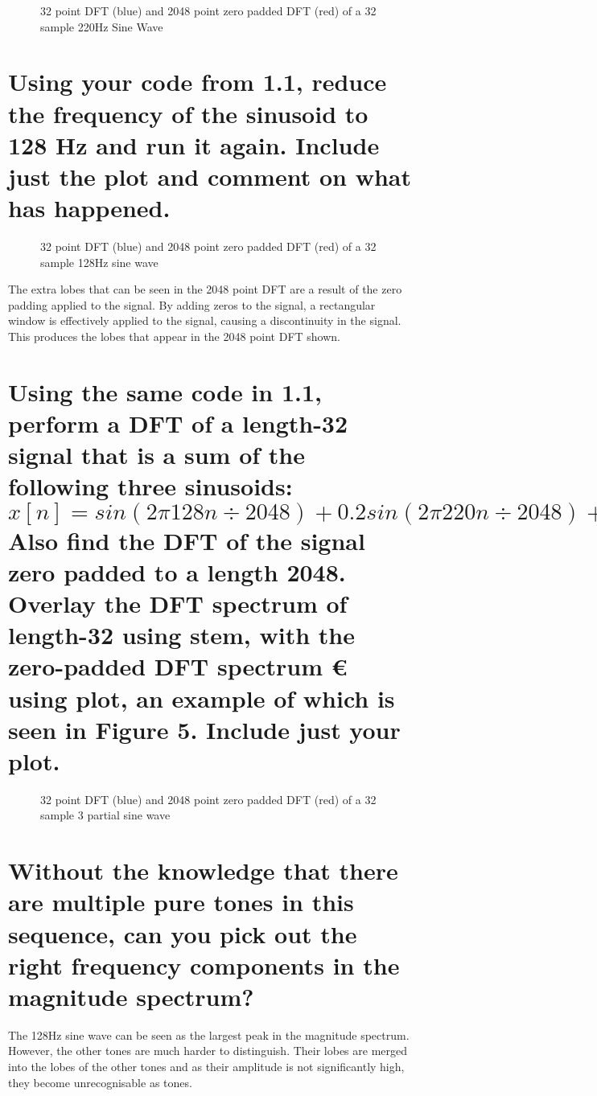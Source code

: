 \documentclass[titlepage]{scrartcl}
\begin{document}
\begin{figure}[H]
    \caption{32 point DFT (blue) and 2048 point zero padded DFT (red) of a
    32 sample 220Hz Sine Wave}
    \label{ZeropadDFT1}
\end{figure}

\section{Using your code from 1.1, reduce the frequency of the sinusoid to 128
Hz and run it again. Include just the plot and comment on what has happened.}
\begin{figure}[H]
    \caption{32 point DFT (blue) and 2048 point zero padded DFT (red) of a 32
    sample 128Hz sine wave}
    \label{ZeropadDFT2}
\end{figure}

The extra lobes that can be seen in the 2048 point DFT are a result of the
zero padding applied to the signal. By adding zeros to the signal, a rectangular
window is effectively applied to the signal, causing a discontinuity in the
signal. This produces the lobes that appear in the 2048 point DFT shown.
\pagebreak
\section{Using the same code in 1.1, perform a DFT of a length-32 signal that
    is a sum of the following three
    sinusoids:
    $$x[n]=sin(2\pi128n\div2048)+0.2sin(2\pi220n\div2048)+0.01cos(2\pi525n\div2048)$$
    Also find the DFT of the signal zero padded to a length 2048. Overlay
    the
DFT spectrum of length-32 using stem, with the zero-padded DFT
    spectrum
€
using plot, an example of which is seen in Figure 5. Include
just your plot.}
\begin{figure}[H]
    \caption{32 point DFT (blue) and 2048 point zero padded DFT (red) of a 32
    sample 3 partial sine wave}
    \label{ZeropadDFT3}
\end{figure}

\section{Without the knowledge that there are multiple pure tones in this
sequence, can you pick out the right frequency components in the magnitude
spectrum?}
The 128Hz sine wave can be seen as the largest peak in the magnitude spectrum.
However, the other tones are much harder to distinguish. Their lobes are merged
into the lobes of the other tones and as their amplitude is not significantly
high, they become unrecognisable as tones.
\end{document}
